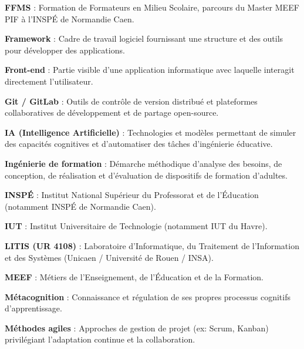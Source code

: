 \documentclass[12pt,a4paper]{report}
\begin{document}
\begin{tcolorbox}[colback=white,colframe=headercolor,title=\textbf{F},fonttitle=\large\bfseries]
\textbf{FFMS} : Formation de Formateurs en Milieu Scolaire, parcours du Master MEEF PIF à l'INSPÉ de Normandie Caen.

\textbf{Framework} : Cadre de travail logiciel fournissant une structure et des outils pour développer des applications.

\textbf{Front-end} : Partie visible d'une application informatique avec laquelle interagit directement l'utilisateur.
\end{tcolorbox}

\begin{tcolorbox}[colback=white,colframe=headercolor,title=\textbf{G},fonttitle=\large\bfseries]
\textbf{Git / GitLab} : Outils de contrôle de version distribué et plateformes collaboratives de développement et de partage open-source.
\end{tcolorbox}

\begin{tcolorbox}[colback=white,colframe=headercolor,title=\textbf{I},fonttitle=\large\bfseries]
\textbf{IA (Intelligence Artificielle)} : Technologies et modèles permettant de simuler des capacités cognitives et d'automatiser des tâches d'ingénierie éducative.

\textbf{Ingénierie de formation} : Démarche méthodique d'analyse des besoins, de conception, de réalisation et d'évaluation de dispositifs de formation d'adultes.

\textbf{INSPÉ} : Institut National Supérieur du Professorat et de l'Éducation (notamment INSPÉ de Normandie Caen).

\textbf{IUT} : Institut Universitaire de Technologie (notamment IUT du Havre).
\end{tcolorbox}

\begin{tcolorbox}[colback=white,colframe=headercolor,title=\textbf{L},fonttitle=\large\bfseries]
\textbf{LITIS (UR 4108)} : Laboratoire d'Informatique, du Traitement de l'Information et des Systèmes (Unicaen / Université de Rouen / INSA).
\end{tcolorbox}

\begin{tcolorbox}[colback=white,colframe=headercolor,title=\textbf{M},fonttitle=\large\bfseries]
\textbf{MEEF} : Métiers de l'Enseignement, de l'Éducation et de la Formation.

\textbf{Métacognition} : Connaissance et régulation de ses propres processus cognitifs d'apprentissage.

\textbf{Méthodes agiles} : Approches de gestion de projet (ex: Scrum, Kanban) privilégiant l'adaptation continue et la collaboration.
\end{tcolorbox}
\end{document}
